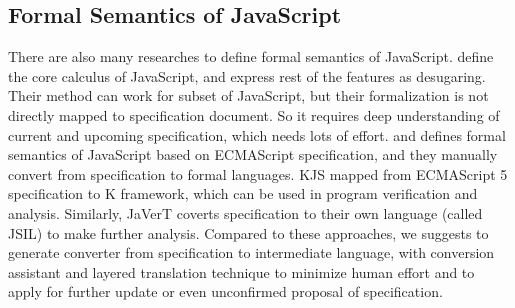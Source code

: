 
\subsection{Formal Semantics of JavaScript}


There are also many researches to define formal semantics of JavaScript. \cite{lambdajs} define the core calculus of JavaScript, and express rest of the features as desugaring. Their method can
work for subset of JavaScript, but their formalization is not directly mapped to specification document. So it requires deep understanding of current and upcoming specification,
which needs lots of effort. \cite{kjs} and \cite{javert} defines formal semantics of JavaScript based on ECMAScript specification, and they manually convert from specification
to formal languages. KJS mapped from ECMAScript 5 specification to K framework, which can be used in program verification and analysis. Similarly, JaVerT coverts specification
to their own language (called JSIL) to make further analysis. Compared to these approaches, we suggests to generate converter from specification to intermediate language, with
conversion assistant and layered translation technique to minimize human effort and to apply for further update or even unconfirmed proposal of specification.

